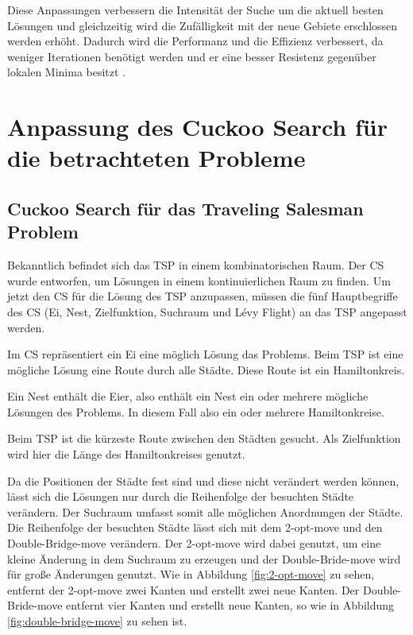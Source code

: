 \documentclass[conference]{IEEEtran}
\begin{document}
      Diese Anpassungen verbessern die Intensität der Suche um die aktuell besten Lösungen und gleichzeitig wird 
      die Zufälligkeit mit der neue Gebiete erschlossen werden erhöht. Dadurch wird die Performanz und die Effizienz 
      verbessert, da weniger Iterationen benötigt werden und er eine besser Resistenz gegenüber lokalen Minima besitzt \cite{b9}.

  \section{Anpassung des Cuckoo Search für die betrachteten Probleme}
    \subsection{Cuckoo Search für das Traveling Salesman Problem}
      Bekanntlich befindet sich das TSP in einem kombinatorischen Raum. Der CS wurde entworfen, 
      um Lösungen in einem kontinuierlichen Raum zu finden. Um jetzt den CS für die Lösung des TSP anzupassen, 
      müssen die fünf Hauptbegriffe des CS (Ei, Nest, Zielfunktion, Suchraum und Lévy Flight) an das TSP angepasst werden. 

      Im CS repräsentiert ein Ei eine möglich Lösung das Problems. Beim TSP ist eine mögliche Lösung eine 
      Route durch alle Städte. Diese Route ist ein Hamiltonkreis.

      Ein Nest enthält die Eier, also enthält ein Nest ein oder mehrere mögliche Lösungen des Problems. 
      In diesem Fall also ein oder mehrere Hamiltonkreise.

      Beim TSP ist die kürzeste Route zwischen den Städten gesucht. Als Zielfunktion wird hier 
      die Länge des Hamiltonkreises genutzt. 

      Da die Positionen der Städte fest sind und diese nicht verändert werden können, lässt sich 
      die Lösungen nur durch die Reihenfolge der besuchten Städte verändern. Der Suchraum umfasst somit alle 
      möglichen Anordnungen der Städte. Die Reihenfolge der besuchten Städte lässt sich mit dem 2-opt-move \cite{b10} 
      und den Double-Bridge-move \cite{b10} verändern. Der 2-opt-move wird dabei genutzt, um eine kleine Änderung 
      in dem Suchraum zu erzeugen und der Double-Bride-move wird für große Änderungen genutzt. Wie 
      in Abbildung \ref{fig:2-opt-move} zu sehen, entfernt der 2-opt-move zwei Kanten und erstellt zwei neue Kanten. 
      Der Double-Bride-move entfernt vier Kanten und erstellt neue Kanten, so wie in 
      Abbildung \ref{fig:double-bridge-move} zu sehen ist.
\end{document}
